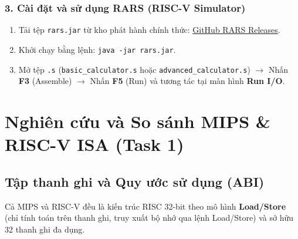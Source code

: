 \documentclass[12pt,a4paper]{article}
\begin{document}
\subsubsection{3. Cài đặt và sử dụng RARS (RISC-V Simulator)}
\begin{enumerate}
    \item Tải tệp \texttt{rars.jar} từ kho phát hành chính thức: \href{https://github.com/TheThirdOne/rars/releases}{GitHub RARS Releases}.
    \item Khởi chạy bằng lệnh: \texttt{java -jar rars.jar}.
    \item Mở tệp \texttt{.s} (\texttt{basic\_calculator.s} hoặc \texttt{advanced\_calculator.s}) $\rightarrow$ Nhấn \textbf{F3} (Assemble) $\rightarrow$ Nhấn \textbf{F5} (Run) và tương tác tại màn hình \textbf{Run I/O}.
\end{enumerate}

\section{Nghiên cứu và So sánh MIPS \& RISC-V ISA (Task 1)}

\subsection{Tập thanh ghi và Quy ước sử dụng (ABI)}
Cả MIPS và RISC-V đều là kiến trúc RISC 32-bit theo mô hình \textbf{Load/Store} (chỉ tính toán trên thanh ghi, truy xuất bộ nhớ qua lệnh Load/Store) và sở hữu 32 thanh ghi đa dụng.
\end{document}
